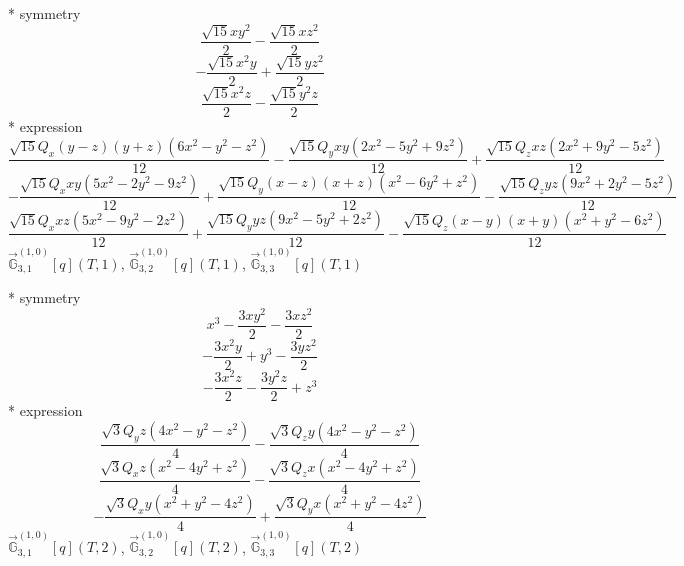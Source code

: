 \documentclass[fleqn,8pt]{jsarticle}
\begin{document}
\noindent\quad ** symmetry
\begin{dmath*}
\frac{\sqrt{15} x y^{2}}{2} - \frac{\sqrt{15} x z^{2}}{2}
\end{dmath*}
\begin{dmath*}
- \frac{\sqrt{15} x^{2} y}{2} + \frac{\sqrt{15} y z^{2}}{2}
\end{dmath*}
\begin{dmath*}
\frac{\sqrt{15} x^{2} z}{2} - \frac{\sqrt{15} y^{2} z}{2}
\end{dmath*}
\noindent\quad ** expression
\begin{dmath*}
\frac{\sqrt{15} Q_{x} \left(y - z\right) \left(y + z\right) \left(6 x^{2} - y^{2} - z^{2}\right)}{12} - \frac{\sqrt{15} Q_{y} x y \left(2 x^{2} - 5 y^{2} + 9 z^{2}\right)}{12} + \frac{\sqrt{15} Q_{z} x z \left(2 x^{2} + 9 y^{2} - 5 z^{2}\right)}{12}
\end{dmath*}
\begin{dmath*}
- \frac{\sqrt{15} Q_{x} x y \left(5 x^{2} - 2 y^{2} - 9 z^{2}\right)}{12} + \frac{\sqrt{15} Q_{y} \left(x - z\right) \left(x + z\right) \left(x^{2} - 6 y^{2} + z^{2}\right)}{12} - \frac{\sqrt{15} Q_{z} y z \left(9 x^{2} + 2 y^{2} - 5 z^{2}\right)}{12}
\end{dmath*}
\begin{dmath*}
\frac{\sqrt{15} Q_{x} x z \left(5 x^{2} - 9 y^{2} - 2 z^{2}\right)}{12} + \frac{\sqrt{15} Q_{y} y z \left(9 x^{2} - 5 y^{2} + 2 z^{2}\right)}{12} - \frac{\sqrt{15} Q_{z} \left(x - y\right) \left(x + y\right) \left(x^{2} + y^{2} - 6 z^{2}\right)}{12}
\end{dmath*}
\noindent\quad $\vec{\mathbb{G}}_{3,1}^{(1,0)}[q](T,1)$, $\vec{\mathbb{G}}_{3,2}^{(1,0)}[q](T,1)$, $\vec{\mathbb{G}}_{3,3}^{(1,0)}[q](T,1)$

\noindent\quad ** symmetry
\begin{dmath*}
x^{3} - \frac{3 x y^{2}}{2} - \frac{3 x z^{2}}{2}
\end{dmath*}
\begin{dmath*}
- \frac{3 x^{2} y}{2} + y^{3} - \frac{3 y z^{2}}{2}
\end{dmath*}
\begin{dmath*}
- \frac{3 x^{2} z}{2} - \frac{3 y^{2} z}{2} + z^{3}
\end{dmath*}
\noindent\quad ** expression
\begin{dmath*}
\frac{\sqrt{3} Q_{y} z \left(4 x^{2} - y^{2} - z^{2}\right)}{4} - \frac{\sqrt{3} Q_{z} y \left(4 x^{2} - y^{2} - z^{2}\right)}{4}
\end{dmath*}
\begin{dmath*}
\frac{\sqrt{3} Q_{x} z \left(x^{2} - 4 y^{2} + z^{2}\right)}{4} - \frac{\sqrt{3} Q_{z} x \left(x^{2} - 4 y^{2} + z^{2}\right)}{4}
\end{dmath*}
\begin{dmath*}
- \frac{\sqrt{3} Q_{x} y \left(x^{2} + y^{2} - 4 z^{2}\right)}{4} + \frac{\sqrt{3} Q_{y} x \left(x^{2} + y^{2} - 4 z^{2}\right)}{4}
\end{dmath*}
\noindent\quad $\vec{\mathbb{G}}_{3,1}^{(1,0)}[q](T,2)$, $\vec{\mathbb{G}}_{3,2}^{(1,0)}[q](T,2)$, $\vec{\mathbb{G}}_{3,3}^{(1,0)}[q](T,2)$
\end{document}
